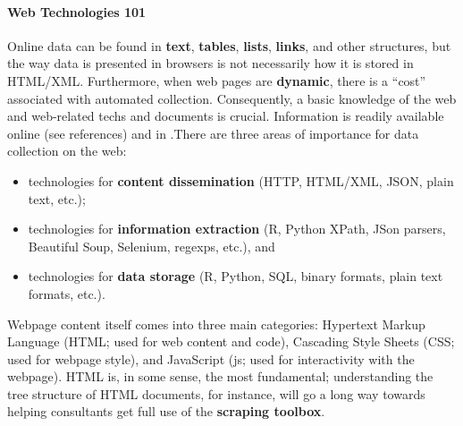 \paragraph{Web Technologies 101}
Online data can be found in \textbf{text}, \textbf{tables}, \textbf{lists}, \textbf{links}, and other structures, but the way data is presented in browsers is not necessarily how it is stored in HTML/XML. Furthermore, when web pages are \textbf{dynamic}, there is a ``cost'' associated with automated collection. Consequently, a basic knowledge of the web and web-related techs and documents is crucial. Information is readily available online (see references) and in  \cite{DC_M,DC_MRMN}.\newpage\noindent There are three areas of importance for data collection on the web:
\begin{itemize}[noitemsep]
\item technologies for \textbf{content dissemination} (HTTP, HTML/XML, JSON, plain text, etc.);
\item technologies for \textbf{information extraction} (R, Python XPath, JSon parsers, Beautiful Soup, Selenium, regexps, etc.), and 
\item technologies for \textbf{data storage} (R, Python, SQL, binary formats, plain text formats, etc.).
\end{itemize}
Webpage content itself comes into three main categories: Hypertext Markup Language (HTML; used for web content and code), Cascading Style Sheets (CSS; used for webpage style), and 
JavaScript (js; used for interactivity with the webpage). HTML is, in some sense, the most fundamental; understanding the tree structure of HTML documents, for instance, will go a long way towards helping consultants get full use of the \textbf{scraping toolbox}. 
